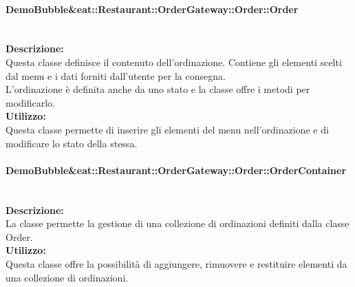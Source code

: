 \paragraph{Demo\-Bubble\&eat\-::Restaurant\-::Order\-Gateway\-::Order\-::Order}\label{eat-order}\mbox{}\\ 
\textbf{Descrizione:}\\ \nopagebreak
Questa classe definisce il contenuto dell'ordinazione. Contiene gli elementi scelti dal menu e i dati forniti dall'utente per la consegna.\\
L'ordinazione è definita anche da uno stato e la classe offre i metodi per modificarlo. \\
\textbf{Utilizzo:}\\ \nopagebreak
Questa classe permette di inserire gli elementi del menu nell'ordinazione e di modificare lo stato della stessa. 

\paragraph{Demo\-Bubble\&eat\-::Restaurant\-::Order\-Gateway\-::Order\-::Order\-Contai\-ner}\label{eat-container}\mbox{}\\
\textbf{Descrizione:}\\ \nopagebreak
La classe permette la gestione di una collezione di ordinazioni definiti dalla classe Order.\\
\textbf{Utilizzo:}\\ \nopagebreak
Questa classe offre la possibilità di aggiungere, rimuovere e restituire elementi da una collezione di ordinazioni.